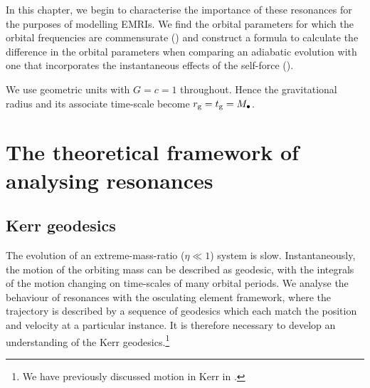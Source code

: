 In this chapter, we begin to characterise the importance of these resonances for the purposes of modelling EMRIs. We find the orbital parameters for which the orbital frequencies are commensurate () and construct a formula to calculate the difference in the orbital parameters when comparing an adiabatic evolution with one that incorporates the instantaneous effects of the self-force ().

We use geometric units with $G = c = 1$ throughout. Hence the gravitational radius and its associate time-scale become $r_\mathrm{g} = t_\mathrm{g} = M_\bullet$.

\section{The theoretical framework of analysing resonances}

\subsection{Kerr geodesics}

The evolution of an extreme-mass-ratio ($\eta \ll 1$) system is slow. Instantaneously, the motion of the orbiting mass can be described as geodesic, with the integrals of the motion changing on time-scales of many orbital periods. We analyse the behaviour of resonances with the osculating element framework, where the trajectory is described by a sequence of geodesics which each match the position and velocity at a particular instance. It is therefore necessary to develop an understanding of the Kerr geodesics.\footnote{We have previously discussed motion in Kerr in .}

